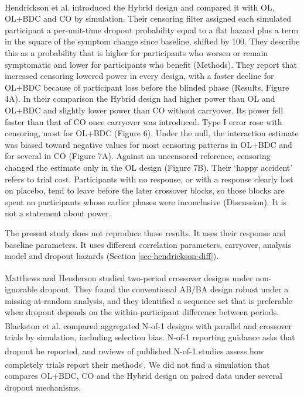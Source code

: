 \documentclass[
  11pt,
]{article}
\begin{document}
Hendrickson et al.\textsuperscript{} introduced the Hybrid design and compared it with
OL, OL+BDC and CO by simulation. Their censoring filter assigned each
simulated participant a per-unit-time dropout probability equal to a
flat hazard plus a term in the square of the symptom change since
baseline, shifted by 100. They describe this as a probability that is
higher for participants who worsen or remain symptomatic and lower for
participants who benefit (Methods). They report that increased
censoring lowered power in every design, with a faster decline for
OL+BDC because of participant loss before the blinded phase (Results,
Figure 4A). In their comparison the Hybrid design had higher power
than OL and OL+BDC and slightly lower power than CO without carryover.
Its power fell faster than that of CO once carryover was introduced.
Type I error rose with censoring, most for OL+BDC (Figure 6). Under the
null, the interaction estimate was biased toward negative values for
most censoring patterns in OL+BDC and for several in CO (Figure 7A).
Against an uncensored reference, censoring changed the estimate only
in the OL design (Figure 7B). Their `happy accident' refers to trial
cost. Participants with no response, or with a response clearly lost
on placebo, tend to leave before the later crossover blocks, so those
blocks are spent on participants whose earlier phases were
inconclusive (Discussion). It is not a statement about power.

The present study does not reproduce those results. It uses their
response and baseline parameters. It uses different correlation
parameters, carryover, analysis model and dropout hazards
(Section \ref{sec-hendrickson-diff}).

Matthews and Henderson\textsuperscript{} studied two-period crossover designs under
non-ignorable dropout. They found the conventional AB/BA design robust
under a missing-at-random analysis, and they identified a sequence set
that is preferable when dropout depends on the within-participant
difference between periods. Blackston et al.\textsuperscript{} compared aggregated N-of-1
designs with parallel and crossover trials by simulation, including
selection bias. N-of-1 reporting guidance asks that dropout be reported\textsuperscript{}, and reviews of published N-of-1
studies assess how completely trials report their methods\textsuperscript{,}. We did not find a
simulation that compares OL+BDC, CO and the Hybrid design on paired
data under several dropout mechanisms.
\end{document}
